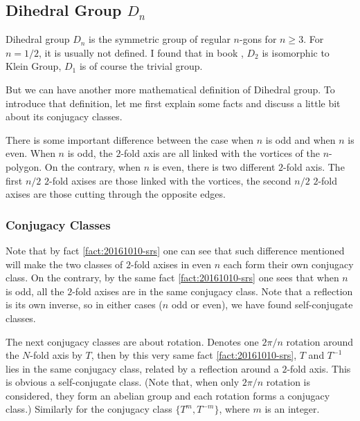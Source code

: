 \subsection{Dihedral Group \texorpdfstring{$D_n$}{}}
\label{sec:Dihedral-Group}
\begin{defi}
    Dihedral group $D_n$ is the symmetric group of regular $n$-gons
    for $n\geq 3$. For $n=1/2$, it is usually not defined. I found that
    in book \cite{book}, $D_2$ is isomorphic to Klein Group, $D_1$ is
    of course the trivial group.
\end{defi}

But we can have another more mathematical definition of Dihedral
group. To introduce that definition, let me first explain some facts
and discuss a little bit about its conjugacy classes.

There is some important difference between the case when $n$ is odd
and when $n$ is even. When $n$ is odd, the $2$-fold axis are all
linked with the vortices of the $n$-polygon. On the contrary, when $n$
is even, there is two different $2$-fold axis. The first $n/2$
$2$-fold axises are those linked with the vortices, the second $n/2$
$2$-fold axises are those cutting through the opposite edges. 

\subsubsection{Conjugacy Classes}
Note that by fact \ref{fact:20161010-srs} one can see that such
difference mentioned will make the two classes of $2$-fold axises in
even $n$ each form their own conjugacy class. On the contrary, by the
same fact \ref{fact:20161010-srs} one sees that when $n$ is odd, all
the $2$-fold axises are in the same conjugacy class. Note that a
reflection is its own inverse, so in either cases ($n$ odd or even),
we have found self-conjugate classes.

The next conjugacy classes are about rotation. Denotes one $2\pi/n$
rotation around the $N$-fold axis by $T$, then by this very same fact
\ref{fact:20161010-srs}, $T$ and $T^{-1}$ lies in the same conjugacy
class, related by a reflection around a $2$-fold axis. This is obvious
a self-conjugate class. (Note that, when only $2\pi/n$ rotation is
considered, they form an abelian group and each rotation forms a
conjugacy class.) Similarly for the conjugacy class $\{T^m, T^{-m}\}$,
where $m$ is an integer.

